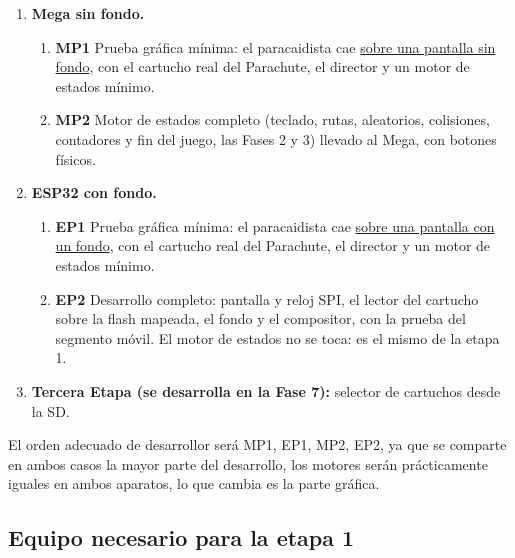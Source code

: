 \begin{enumerate}
	\item \textbf{Mega sin fondo.}
	\begin{enumerate}
		\item \textbf{MP1} Prueba gráfica mínima: el paracaidista cae \underline{sobre una pantalla sin fondo}, con el cartucho real del Parachute, el director y un motor de estados mínimo.
		\item \textbf{MP2} Motor de estados completo (teclado, rutas, aleatorios, colisiones, contadores y fin del juego, las Fases 2 y 3) llevado al Mega, con botones físicos.
	\end{enumerate}
	\item \textbf{ESP32 con fondo.} 
	\begin{enumerate}
		\item \textbf{EP1} Prueba gráfica mínima: el paracaidista cae \underline{sobre una pantalla con un fondo}, con el cartucho real del Parachute, el director y un motor de estados mínimo.
		\item \textbf{EP2} Desarrollo completo: pantalla y reloj SPI, el lector del cartucho sobre la flash mapeada, el fondo y el compositor, con la prueba del segmento móvil. El motor de estados no se toca: es el mismo de la etapa 1.
	\end{enumerate}
	\item \textbf{Tercera Etapa (se desarrolla en la Fase 7):} selector de cartuchos desde la SD.
\end{enumerate}

El orden adecuado de desarrollor será MP1, EP1, MP2, EP2, ya que se comparte en ambos casos la mayor parte del desarrollo, los motores serán prácticamente iguales en ambos aparatos, lo que cambia es la parte gráfica.

\subsection{Equipo necesario para la etapa 1}
\label{sec:F6I01Equipo}


